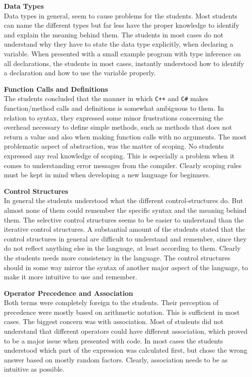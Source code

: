 \textbf{Data Types}\\
Data types in general, seem to cause problems for the students. 
Most students can name the different types but far less have the proper knowledge to identify and explain the meaning behind them. 
The students in most cases do not understand why they have to state the data type explicitly, when declaring a variable. 
When presented with a small example program with type inference on all declarations, the students in most cases, instantly understood how to identify a declaration and how to use the variable properly.

\textbf{Function Calls and Definitions}\\
The students concluded that the manner in which \texttt{C++} and \texttt{C{\#}} makes function/method calls and definitions is somewhat ambiguous to them. 
In relation to syntax, they expressed some minor frustrations concerning the overhead necessary to define simple methods, such as methods that does not return a value and also when making function calls with no arguments. 
The most problematic aspect of abstraction, was the matter of scoping. 
No students expressed any real knowledge of scoping. 
This is especially a problem when it comes to understanding error messages from the compiler. 
Clearly scoping rules must be kept in mind when developing a new language for beginners.

\textbf{Control Structures}\\
In general the students understood what the different control-structures do. 
But almost none of them could remember the specific syntax and the meaning behind them. 
The selective control structures seems to be easier to understand than the iterative control structures. 
A substantial amount of the students stated that the control structures in general are difficult to understand and remember, since they do not reflect anything else in the language, at least according to them.
Clearly the students needs more consistency in the language. 
The control structures should in some way mirror the syntax of another major aspect of the language, to make it more intuitive to use and remember.

\textbf{Operator Precedence and Association}\\
Both terms were completely foreign to the students. 
Their perception of precedence were mostly based on arithmetic notation. 
This is sufficient in most cases. 
The biggest concern was with association. 
Most of students did not understand that different operators could have different association, which proved to be a major issue when presented with code. 
In most cases the students understood which part of the expression was calculated first, but chose the wrong answer based on mostly random factors. 
Clearly, association needs to be as intuitive as possible.

